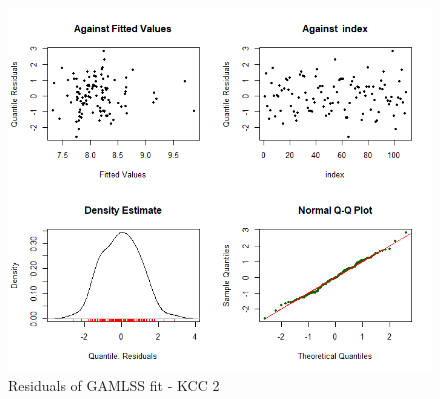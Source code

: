\begin{figure}[H]
\centering
  \includegraphics[width=0.95\linewidth]{figures/gamlss_residuals_kcc_2.png}
  \caption{Residuals of GAMLSS fit - KCC 2}
  \label{fig:gamlss_residuals_kcc_2}
\end{figure}











